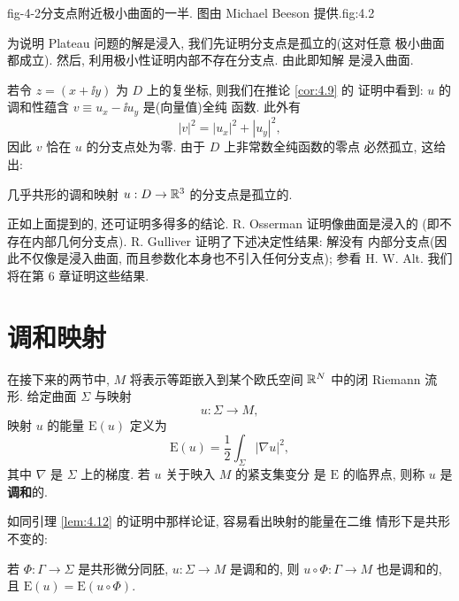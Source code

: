 %
{fig-4-2}{分支点附近极小曲面的一半. 图由 Michael Beeson 提供.}{fig:4.2}

为说明 Plateau 问题的解是浸入, 我们先证明分支点是孤立的(这对任意
极小曲面都成立). 然后, 利用极小性证明内部不存在分支点. 由此即知解
是浸入曲面.

若令 $z=(x+\ii y)$ 为 $D$ 上的复坐标, 则我们在推论 \ref{cor:4.9} 的
证明中看到: $u$ 的调和性蕴含 $v\equiv u_x-\ii u_y$ 是(向量值)全纯
函数. 此外有
\begin{equation}
|v|^2=|u_x|^2+|u_y|^2,
\label{eq:4.30}
\end{equation}
因此 $v$ 恰在 $u$ 的分支点处为零. 由于 $D$ 上非常数全纯函数的零点
必然孤立, 这给出:

\begin{corollary}
\label{cor:4.18}
几乎共形的调和映射 $u:D\to\mathbb{R}^3$ 的分支点是孤立的.
\end{corollary}

正如上面提到的, 还可证明多得多的结论. R. Osserman 证明像曲面是浸入的
(即不存在内部几何分支点). R. Gulliver 证明了下述决定性结果: 解没有
内部分支点(因此不仅像是浸入曲面, 而且参数化本身也不引入任何分支点);
参看 H. W. Alt. 我们将在第 6 章证明这些结果.

\section{调和映射}
\label{sec:4.5}

在接下来的两节中, $M$ 将表示等距嵌入到某个欧氏空间 $\mathbb{R}^N$ 中的闭
Riemann 流形. 给定曲面 $\Sigma$ 与映射
\begin{equation}
u:\Sigma\to M,
\label{eq:4.31}
\end{equation}
映射 $u$ 的能量 $\mathrm{E}(u)$ 定义为
\begin{equation}
\mathrm{E}(u)=\frac12\int_\Sigma|\nabla u|^2,
\label{eq:4.32}
\end{equation}
其中 $\nabla$ 是 $\Sigma$ 上的梯度. 若 $u$ 关于映入 $M$ 的紧支集变分
是 $\mathrm{E}$ 的临界点, 则称 $u$ 是\textbf{调和}的.

如同引理 \ref{lem:4.12} 的证明中那样论证, 容易看出映射的能量在二维
情形下是共形不变的:

\begin{corollary}
\label{cor:4.19}
若 $\Phi:\Gamma\to\Sigma$ 是共形微分同胚, $u:\Sigma\to M$ 是调和的,
则 $u\circ\Phi:\Gamma\to M$ 也是调和的, 且
$\mathrm{E}(u)=\mathrm{E}(u\circ\Phi)$.
\end{corollary}

